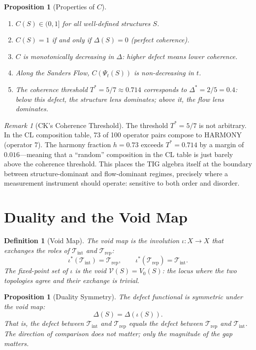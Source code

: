 \documentclass[12pt, openany]{book}
\newtheorem{proposition}[theorem]{Proposition}
\newtheorem{definition}[theorem]{Definition}
\theoremstyle{remark}
\newtheorem{remark}[theorem]{Remark}
\newcommand{\Tint}{\mathcal{T}_{\mathrm{int}}}
\newcommand{\Trep}{\mathcal{T}_{\mathrm{rep}}}
\begin{document}
\begin{proposition}[Properties of $C$]\label{prop:C-props}
\begin{enumerate}
  \item $C(S) \in (0, 1]$ for all well-defined structures $S$.
  \item $C(S) = 1$ if and only if $\Delta(S) = 0$ (perfect coherence).
  \item $C$ is monotonically decreasing in $\Delta$: higher defect means
        lower coherence.
  \item Along the Sanders Flow, $C(\Psi_t(S))$ is non-decreasing in $t$.
  \item The coherence threshold $T^* = 5/7 \approx 0.714$ corresponds to
        $\Delta^* = 2/5 = 0.4$: below this defect, the structure lens dominates;
        above it, the flow lens dominates.
\end{enumerate}
\end{proposition}

\begin{remark}[CK's Coherence Threshold]
The threshold $T^* = 5/7$ is not arbitrary. In the CL composition table,
73 of 100 operator pairs compose to HARMONY (operator 7). The harmony
fraction $h = 0.73$ exceeds $T^* = 0.714$ by a margin of $0.016$---meaning
that a ``random'' composition in the CL table is just barely above the
coherence threshold. This places the TIG algebra itself at the boundary
between structure-dominant and flow-dominant regimes, precisely where a
measurement instrument should operate: sensitive to both order and disorder.
\end{remark}


\section{Duality and the Void Map}
\label{sec:duality-map}

\begin{definition}[Void Map]\label{def:void-map}
The \emph{void map} is the involution $\iota : X \to X$ that exchanges the
roles of $\Tint$ and $\Trep$:
\[
  \iota^*(\Tint) = \Trep, \qquad \iota^*(\Trep) = \Tint.
\]
The fixed-point set of $\iota$ is the void $\mathcal{V}(S) = V_0(S)$:
the locus where the two topologies agree and their exchange is trivial.
\end{definition}

\begin{proposition}[Duality Symmetry]\label{prop:duality-sym}
The defect functional is symmetric under the void map:
\[
  \Delta(S) = \Delta(\iota(S)).
\]
That is, the defect between $\Tint$ and $\Trep$ equals the defect between
$\Trep$ and $\Tint$. The direction of comparison does not matter; only the
magnitude of the gap matters.
\end{proposition}
\end{document}

